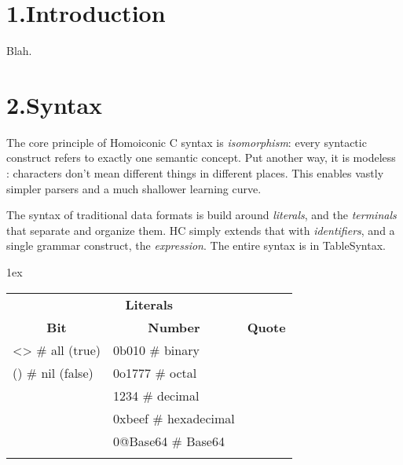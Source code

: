 \documentclass[preprint]{{sigplanconf}}
\begin{document}
\section{1.\hspace*{0.5em}Introduction}\label{sec-intro}%

\noindent Blah.%

\section{2.\hspace*{0.5em}Syntax}\label{sec-frames}%

\noindent The core principle of Homoiconic C syntax is \emph{isomorphism}: every
syntactic construct refers to exactly one semantic concept. Put another
way, it is modeless : characters don't mean different things in different
places. This enables vastly simpler parsers and a much shallower learning
curve.%

The syntax of traditional data formats is build around \emph{literals}, and
the \emph{terminals} that separate and organize them. HC simply extends that
with \emph{identifiers}, and a single grammar construct, the \emph{expression}. The
entire syntax is in TableSyntax.%

\begin{table}[tbp]%
\begin{mdcenter}%
\begin{mdtabular}{3}{}{1ex}%
\begin{tabular}{lll}\midrule
\multicolumn{3}{|c|}{{\bfseries Literals}}\\
\multicolumn{1}{|c}{{\bfseries Bit}}&\multicolumn{1}{|c}{{\bfseries Number}}&\multicolumn{1}{|c|}{{\bfseries Quote}}\\

\midrule
\multicolumn{1}{|l}{\textless{}\textgreater{} \# all (true)}&\multicolumn{1}{|l}{0b010 \# binary}&\multicolumn{1}{|l|}{}\\
\multicolumn{1}{|l}{() \# nil (false)}&\multicolumn{1}{|l}{0o1777 \# octal}&\multicolumn{1}{|l|}{}\\
\multicolumn{1}{|l}{}&\multicolumn{1}{|l}{1234 \# decimal}&\multicolumn{1}{|l|}{}\\
\multicolumn{1}{|l}{}&\multicolumn{1}{|l}{0xbeef \# hexadecimal}&\multicolumn{1}{|l|}{}\\
\multicolumn{1}{|l}{}&\multicolumn{1}{|l}{0@Base64 \# Base64}&\multicolumn{1}{|l|}{}\\
\midrule
\multicolumn{1}{|l}{}&\multicolumn{1}{|l}{}&\multicolumn{1}{|l|}{}\\
\end{tabular}\end{mdtabular}

\mdhr{}%

\noindent{}%
\end{mdcenter}%
\end{table}%
\end{document}
